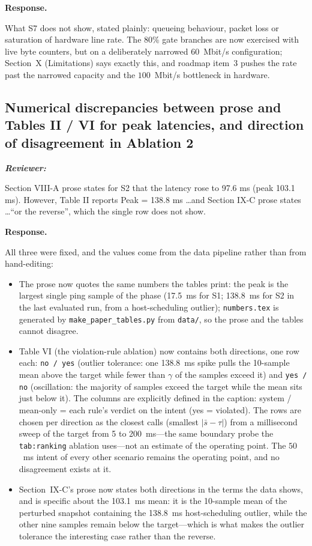 \documentclass[11pt,a4paper]{article}
\newenvironment{reviewer}{\par\medskip\noindent\begin{minipage}{\linewidth}\small\itshape\color{quote}\textbf{Reviewer:}\par}{\end{minipage}\medskip\par}
\newenvironment{response}{\par\noindent\begin{minipage}{\linewidth}\small\textbf{Response.}\par}{\end{minipage}\medskip\par}
\begin{document}
\begin{response}
What S7 does not show, stated plainly: queueing behaviour, packet loss or
saturation of hardware line rate. The $80\%$ gate branches are now exercised
with live byte counters, but on a deliberately narrowed $60$~Mbit/s
configuration; Section~X (Limitations) says exactly this, and roadmap
item~3 pushes the rate past the narrowed capacity and the $100$~Mbit/s
bottleneck in hardware.
\end{response}

\subsection{Numerical discrepancies between prose and Tables II / VI for
peak latencies, and direction of disagreement in Ablation 2}

\begin{reviewer}
Section VIII-A prose states for S2 that the latency rose to 97.6 ms (peak
103.1 ms). However, Table II reports Peak = 138.8 ms \ldots and Section IX-C
prose states \dots ``or the reverse'', which the single row does not show.
\end{reviewer}

\begin{response}
All three were fixed, and the values come from the data pipeline rather
than from hand-editing:

\begin{itemize}
  \item The prose now quotes the same numbers the tables print: the peak
    is the largest single ping sample of the phase (17.5~ms for S1;
    138.8~ms for S2 in the last evaluated run, from a host-scheduling
    outlier); \texttt{numbers.tex} is generated by
    \texttt{make\_paper\_tables.py} from \texttt{data/}, so the prose and
    the tables cannot disagree.
  \item Table VI (the violation-rule ablation) now contains both directions, one row each:
    \texttt{no / yes} (outlier tolerance: one 138.8~ms spike pulls the
    10-sample mean above the target while fewer than $\gamma$ of the
    samples exceed it) and \texttt{yes / no} (oscillation: the majority of
    samples exceed the target while the mean sits just below it). The
    columns are explicitly defined in the caption: system / mean-only =
    each rule's verdict on the intent (yes = violated). The rows are chosen
    per direction as the closest calls (smallest $|\bar{s}-\tau|$) from a
    millisecond sweep of the target from 5 to 200~ms---the same boundary
    probe the \texttt{tab:ranking} ablation uses---not an estimate of the
    operating point. The $50$~ms intent of every other scenario remains the
    operating point, and no disagreement exists at it.
  \item Section~IX-C's prose now states both directions in the terms the
    data shows, and is specific about the 103.1~ms mean: it is the
    10-sample mean of the perturbed snapshot containing the
    138.8~ms host-scheduling outlier, while the other nine samples remain
    below the target---which is what makes the outlier tolerance the
    interesting case rather than the reverse.
\end{itemize}
\end{response}
\end{document}
